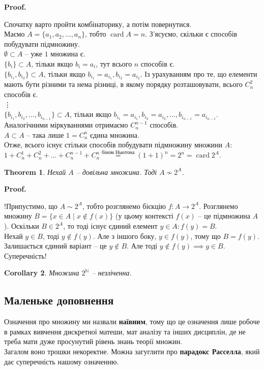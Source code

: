 \documentclass[a4paper, 14pt]{extarticle}
\makeatletter
\theoremstyle{theoremdd}
\newtheorem{theorem}{Theorem}[subsection]
\theoremstyle{theoremdd}
\theoremstyle{theoremdd}
\theoremstyle{theoremdd}
\theoremstyle{theoremdd}
\theoremstyle{theoremdd}
\theoremstyle{theoremdd}
\theoremstyle{theoremdd}
\theoremstyle{theoremdd}
\theoremstyle{theoremdd}
\theoremstyle{theoremdd}
\theoremstyle{theoremdd}
\theoremstyle{theoremdd}
\theoremstyle{theoremdd}
\newtheorem{corollary}[theorem]{Corollary}
\theoremstyle{theoremdd}
\renewenvironment{proof}[1][Proof.\\]{\par
\pushQED{\hfill \qed}%
\normalfont \topsep6\p@\@plus6\p@\relax
\trivlist
\item\relax
{\bfseries
#1\@addpunct{.}}\hspace\labelsep\ignorespaces
}{%
\popQED\endtrivlist\@endpefalse
}
\DeclareMathOperator{\card}{card}
\makeatother
\begin{document}
\begin{proof}
Спочатку варто пройти комбінаторику, а потім повернутися.\\
Маємо $A = \{a_1,a_2,\dots,a_n\}$, тобто $\card A = n$. З'ясуємо, скільки є способів побудувати підмножину.\\
$\emptyset \subset A$ -- уже $1$ множина є.\\
$\{b_i\} \subset A$, тільки якщо $b_i = a_i$, тут всього $n$ способів є.\\
$\{b_{i_1},b_{i_2}\} \subset A$, тільки якщо $b_{i_1} = a_{i_1}, b_{i_2} = a_{i_2}$. Із урахуванням про те, що елементи мають бути різними та нема різниці, в якому порядку розташовувати, всього $C_n^2$ способів є.\\
\vdots \\
$\{b_{i_1},b_{i_2},\dots,b_{i_{n-1}}\} \subset A$, тільки якщо $b_{i_1} = a_{i_1}, b_{i_2} = a_{i_2}, \dots, b_{i_{n-1}} = a_{i_{n-1}}$. Аналогічними міркуваннями отримаємо $C_n^{n-1}$ способів.\\
$A \subset A$ -- така лише $1 = C_n^n$ єдина множина.\\
Отже, всього існує стільки способів побудувати підмножину множини $A$:\\
$1 + C_n^1 + C_n^2 + \dots + C_n^{n-1} + C_n^n \overset{\text{біном Ньютона}}{=} (1+1)^n = 2^n = \card 2^A$.
\end{proof}

\begin{theorem}
Нехай $A$ -- довільна множина. Тоді $A \not\sim 2^A$.
\end{theorem}

\begin{proof}
!Припустимо, що $A \sim 2^A$, тобто розглянемо бієкцію $f \colon A \to 2^A$. Розглянемо множину $B = \{x \in A \mid x \notin f(x)\}$ (у цьому контексті $f(x)$ -- це підмножина $A$). Оскільки $B \in 2^A$, то тоді існує єдиний елемент $y \in A: f(y) = B$.\\
Нехай $y \in B$, тоді $y \notin f(y)$. Але з іншого боку, $y \in f(y)$, тому що $B = f(y)$. Залишається єдиний варіант -- це $y \notin B$. Але тоді $y \notin f(y) \implies y \in B$. Суперечність!
\end{proof}

\begin{corollary}
Множина $2^\mathbb{N}$ -- незліченна.
\end{corollary}

\subsection*{Маленьке доповнення}
Означення про множину ми назвали \textbf{наївним}, тому що це означення лише робоче в рамках вивчення дискретної матеши, мат аналізу та інших дисциплін, де не треба мати дуже просунутий рівень знань теорії множин.\\
Загалом воно трошки некоректне. Можна загуглити про \textbf{парадокс Расселла}, який дає суперечність нашому означенню.
\newpage
\end{document}

